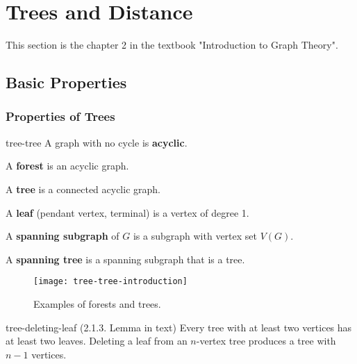 \documentclass[../src/handouts/main.tex]{subfiles}
\begin{document}

\section{Trees and Distance}

This section is the chapter 2 in the textbook "Introduction to Graph Theory".




\subsection{Basic Properties}



\subsubsection{Properties of Trees}

\begin{definition}{}{tree-tree}
  A graph with no cycle is \textbf{acyclic}.

  A \textbf{forest} is an acyclic graph.

  A \textbf{tree} is a connected acyclic graph.

  A \textbf{leaf} (pendant vertex, terminal) is a vertex of degree 1.

  A \textbf{spanning subgraph} of $G$ is a subgraph with vertex set $V(G)$.

  A \textbf{spanning tree} is a spanning subgraph that is a tree.
\end{definition}

\begin{figure}[htbp]
  \centering
  \texttt{[image: tree-tree-introduction]}
  \caption{Examples of forests and trees.}
\end{figure}

\begin{lemma}{}{tree-deleting-leaf}
  (2.1.3. Lemma in text)
  Every tree with at least two vertices has at least two leaves.
  Deleting a leaf from an $n$-vertex tree produces a tree with $n-1$ vertices.
\end{lemma}
\end{document}
